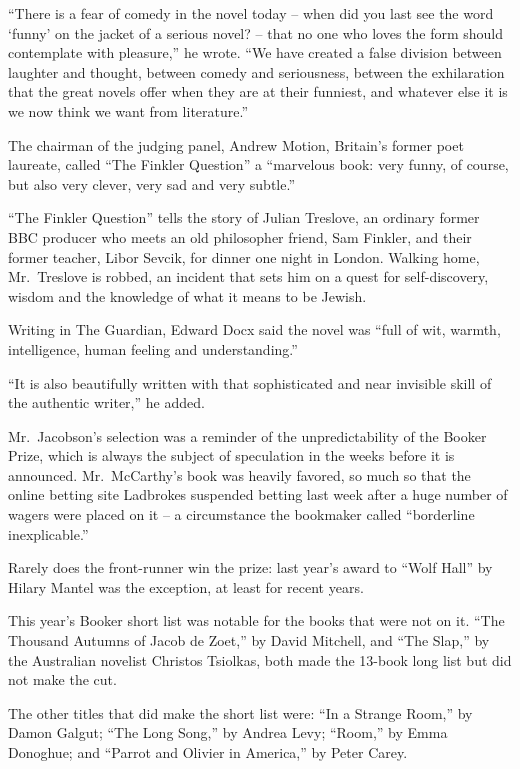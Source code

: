 ﻿\documentclass[12pt]{article}
\begin{document}
``There is a fear of comedy in the novel today -- when did you last see the word `funny' on the
jacket of a serious novel? -- that no one who loves the form should contemplate with pleasure,'' he
wrote. ``We have created a false division between laughter and thought, between comedy and
seriousness, between the exhilaration that the great novels offer when they are at their funniest,
and whatever else it is we now think we want from literature.''

The chairman of the judging panel, Andrew Motion, Britain's former poet laureate, called ``The
Finkler Question'' a ``marvelous book: very funny, of course, but also very clever, very sad and
very subtle.''

``The Finkler Question'' tells the story of Julian Treslove, an ordinary former BBC producer who
meets an old philosopher friend, Sam Finkler, and their former teacher, Libor Sevcik, for dinner one
night in London. Walking home, Mr.~Treslove is robbed, an incident that sets him on a quest for
self-discovery, wisdom and the knowledge of what it means to be Jewish.

Writing in The Guardian, Edward Docx said the novel was ``full of wit, warmth, intelligence, human
feeling and understanding.''

``It is also beautifully written with that sophisticated and near invisible skill of the authentic
writer,'' he added.

Mr.~Jacobson's selection was a reminder of the unpredictability of the Booker Prize, which is always
the subject of speculation in the weeks before it is announced. Mr.~McCarthy's book was heavily
favored, so much so that the online betting site Ladbrokes suspended betting last week after a huge
number of wagers were placed on it -- a circumstance the bookmaker called ``borderline
inexplicable.''

Rarely does the front-runner win the prize: last year's award to ``Wolf Hall'' by Hilary Mantel was
the exception, at least for recent years.

This year's Booker short list was notable for the books that were not on it. ``The Thousand Autumns
of Jacob de Zoet,'' by David Mitchell, and ``The Slap,'' by the Australian novelist Christos
Tsiolkas, both made the 13-book long list but did not make the cut.

The other titles that did make the short list were: ``In a Strange Room,'' by Damon Galgut; ``The
Long Song,'' by Andrea Levy; ``Room,'' by Emma Donoghue; and ``Parrot and Olivier in America,'' by
Peter Carey.
\end{document}
